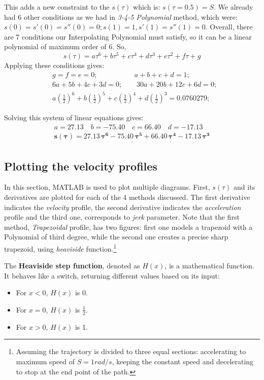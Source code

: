 \documentclass[conference]{IEEEtran}
\begin{document}
\vspace{15px}
This adds a new constraint to the $s(\tau)$ which is: \(s(\tau=0.5) = S\). We already had 6 other conditions as we had in \textit{3-4-5 Polynomial} method, which were:
\(s(0) = s'(0) = s''(0) = 0; s(1) = 1, s'(1) = s''(1) = 0\).
Overall, there are 7 conditions our Interpolating Polynomial must satisfy, so it can be a linear polynomial of maximum order of 6. So,
\[s(\tau) = a\tau^6 + b\tau^5 + c\tau^4 + d\tau^3 + e\tau^2 + f\tau + g\]
Applying these conditions gives:
\begin{align*}
     & g = f = e = 0 ; \quad\quad\quad\quad\quad\, a + b + c + d = 1 ;                         \\
     & 6a + 5b + 4c + 3d = 0 ; \quad\quad 30a + 20b + 12c + 6d = 0 ;                           \\
     & a(\frac{1}{2})^6 + b(\frac{1}{2})^5 + c(\frac{1}{2})^4 + d(\frac{1}{2})^3 = 0.0760279 ;
\end{align*}

Solving this system of linear equations gives:
\begin{gather*}
    a = 27.13 \quad b = -75.40 \quad c =  66.40 \quad d = -17.13 \\
    \underline{\mathbf{s(\tau) = 27.13\, \tau^6 - 75.40\, \tau^5 + 66.40\, \tau^4 - 17.13\, \tau^3}}
\end{gather*}


\subsection{Plotting the velocity profiles}
In this section, MATLAB is used to plot multiple diagrams. First, \(s(\tau)\) and its derivatives are plotted for each of the 4 methods discussed. The first derivative indicates the \emph{velocity} profile, the second derivative indicates the \emph{acceleration} profile and the third one, corresponds to \emph{jerk} parameter. Note that the first method, \textit{Trapezoidal} profile, has two figures: first one models a trapezoid with a Polynomial of third degree, while the second one creates a precise sharp trapezoid, using \textit{heaviside} function.\footnote{Assuming the trajectory is divided to three equal sections: accelerating to maximum speed of \(S = 1 rad/s\), keeping the constant speed and decelerating to stop at the end point of the path.}

The \textbf{Heaviside step function}, denoted as \(H(x)\), is a mathematical function. It behaves like a switch, returning different values based on its input:
\begin{itemize}
    \item For \(x < 0\), \(H(x)\) is 0.
    \item For \(x = 0\), \(H(x)\) is \(\frac{1}{2}\).
    \item For \(x > 0\), \(H(x)\) is 1.
\end{itemize}
\end{document}

